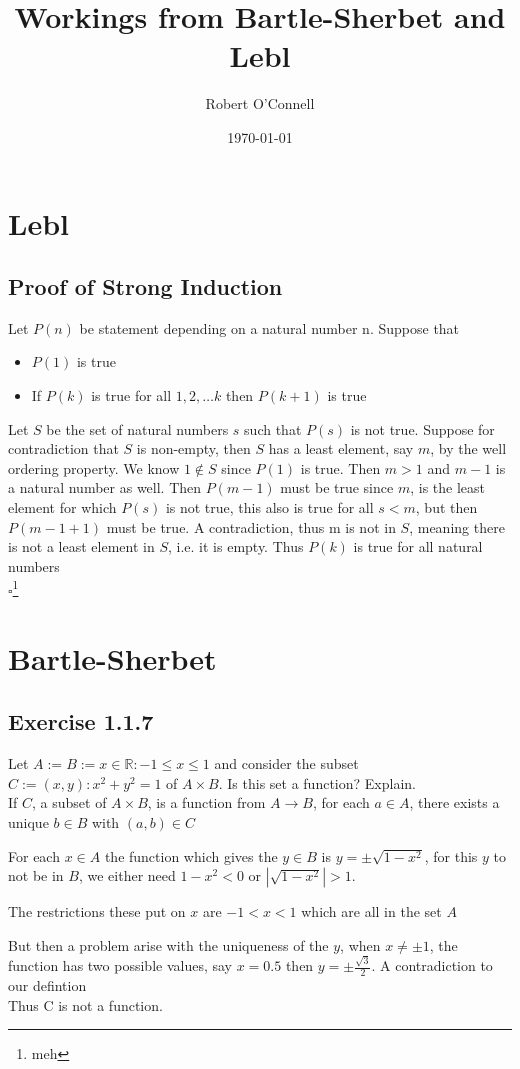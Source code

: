 \documentclass{article}
\title{\textbf{Workings from Bartle-Sherbet and Lebl}}
\author{Robert O'Connell}
\date{\today}
\begin{document}
\maketitle
\vspace{5mm}

\section*{Lebl}
\subsection*{Proof of Strong Induction}
Let \(P(n)\) be statement depending on a natural number n. Suppose that

\begin{itemize}
    \item \(P(1)\) is true
    \item If \(P(k)\) is true for all \(1,2, \dots k\) then \(P(k+1)\) is true
\end{itemize}

Let \(S\) be the set of natural numbers \(s\) such that \(P(s)\) is not true.
Suppose for contradiction that \(S\) is non-empty, then \(S\) has a least element, say \(m\), by the well ordering property.
We know \(1 \notin S\) since \(P(1)\) is true. Then \(m > 1\) and \(m - 1\) is a natural number as well.
Then \(P(m-1)\) must be true since \(m\),  is the least element for which \(P(s)\) is not true, this also is true for all \(s<m\), but then \(P(m-1+1)\) must be true.
A contradiction, thus m is not in \(S\), meaning there is not a least element in \(S\), i.e. it is empty.
Thus \(P(k)\) is true for all natural numbers
\\
\(\square\)\footnote{meh}

\newpage
\section*{Bartle-Sherbet}
\subsection*{Exercise 1.1.7}
Let \(A := B := {x \in \mathbb{R}: -1 \leq x \leq 1}\) and consider the subset
\(C := (x,y):x^2 +y^2 = 1\) of \(A \times B\). Is this set a function? Explain.
\\

If \(C\), a subset of \(A \times B\), is a function from \(A \rightarrow B\), for
each \(a \in A\), there exists a unique \(b \in B\) with \((a,b) \in C\)

For each \(x \in A\) the function which gives the \(y \in B\) is \(y = \pm \sqrt{1 - x^2}\),
for this \(y\) to not be in \(B\), we either need \(1 - x^2 < 0\) or \(|\sqrt{1-x^2}| > 1\).

The restrictions these put on \(x\) are \(-1 < x < 1 \) which are all in the set \(A\)

But then a problem arise with the uniqueness of the \(y\), when \(x \neq \pm 1\), the function has two possible
values, say \(x = 0.5\) then \(y = \pm \frac{\sqrt{3}}{2}\). A contradiction to our defintion
\\

Thus C is not a function.
\end{document}
